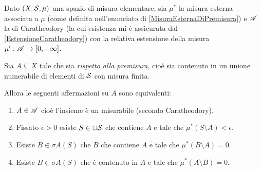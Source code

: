 \begin{proposition}\label{EquivalenzeMisurabilitaSottoinsieme}
	Dato $(X,\S,\mu)$ una spazio di misura elementare, sia $\mu^*$ la misura esterna associata a $\mu$ (come definita nell'enunciato di \cref{MisuraEsternaDiPremisura}) e $\A$ la \sigalg{} di Caratheodory (la cui esistenza mi è assicurata dal \cref{EstensioneCaratheodory}) con la relativa estensione della misura $\mu':\A\to\Rpiu$.
	
	Sia $A\subseteq X$ tale che sia \emph{\sigfin[o] rispetto alla premisura}, cioè sia contenuto in un unione numerabile di elementi di $\S$ con misura finita.
	
	Allora le seguenti affermazioni su $A$ sono equivalenti:
	\begin{enumerate}[label=(\arabic*),ref=(\arabic*)]
		\item $A\in\A$ cioè l'insieme è un misurabile (secondo Caratheodory).\label{MisurabileEquivalenze}
		\item Fissato $\epsilon>0$ esiste $S\in\sqcup\S$ che contiene $A$ e tale che $\mu^*(S\setminus A)<\epsilon$.\label{UnioniDaFuoriEquivalenze}
		\item Esiste $B\in\sigma A(S)$ che $B$ che contiene $A$ e tale che $\mu^*(B\setminus A)=0$.\label{SigmaDaFuoriEquivalenze}
		\item Esiste $B\in\sigma A(S)$ che è contenuto in $A$ e tale che $\mu^*(A\setminus B)=0$.\label{SigmaDaDentroEquivalenze}
	\end{enumerate}
\end{proposition}

